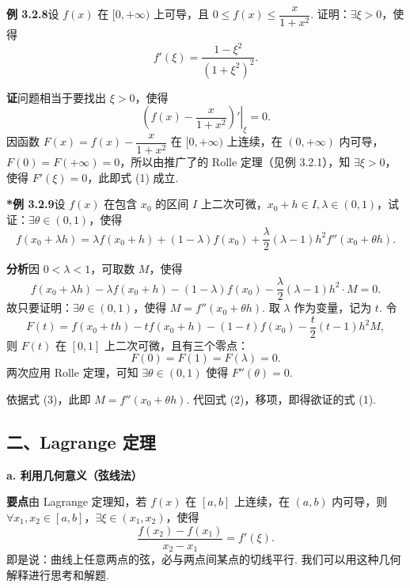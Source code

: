 \documentclass[UTF8,12pt,a4paper,fontset=fandol]{ctexart}
\begin{document}
\noindent\textbf{例 3.2.8}\quad 设 $f(x)$ 在 $[0,+\infty)$ 上可导，且 $0\le f(x)\le\dfrac{x}{1+x^2}$. 证明：$\exists\xi>0$，使得
\[
  f'(\xi)=\frac{1-\xi^2}{(1+\xi^2)^2}.
\]

\noindent\textbf{证}\quad 问题相当于要找出 $\xi>0$，使得
\begin{equation}
  \left.\left(f(x)-\frac{x}{1+x^2}\right)'\right|_{\xi}=0.
\tag{1}
\end{equation}
因函数 $F(x)=f(x)-\dfrac{x}{1+x^2}$ 在 $[0,+\infty)$ 上连续，在 $(0,+\infty)$ 内可导，$F(0)=F(+\infty)=0$，所以由推广了的 Rolle 定理（见例 3.2.1），知 $\exists\xi>0$，使得 $F'(\xi)=0$，此即式 (1) 成立.

\noindent\textbf{*例 3.2.9}\quad 设 $f(x)$ 在包含 $x_0$ 的区间 $I$ 上二次可微，$x_0+h\in I,\lambda\in(0,1)$，试证：$\exists\theta\in(0,1)$，使得
\begin{equation}
  f(x_0+\lambda h)=\lambda f(x_0+h)+(1-\lambda)f(x_0)+\frac{\lambda}{2}(\lambda-1)h^2f''(x_0+\theta h).
\tag{1}
\end{equation}

\noindent\textbf{分析}\quad 因 $0<\lambda<1$，可取数 $M$，使得
\begin{equation}
  f(x_0+\lambda h)-\lambda f(x_0+h)-(1-\lambda)f(x_0)-\frac{\lambda}{2}(\lambda-1)h^2\cdot M=0.
\tag{2}
\end{equation}
故只要证明：$\exists\theta\in(0,1)$，使得 $M=f''(x_0+\theta h)$. 取 $\lambda$ 作为变量，记为 $t$. 令
\begin{equation}
  F(t)=f(x_0+th)-tf(x_0+h)-(1-t)f(x_0)-\frac{t}{2}(t-1)h^2M,
\tag{3}
\end{equation}
则 $F(t)$ 在 $[0,1]$ 上二次可微，且有三个零点：
\[
  F(0)=F(1)=F(\lambda)=0.
\]
两次应用 Rolle 定理，可知 $\exists\theta\in(0,1)$ 使得 $F''(\theta)=0$.

依据式 (3)，此即 $M=f''(x_0+\theta h)$. 代回式 (2)，移项，即得欲证的式 (1).

\subsection*{二、Lagrange 定理}

\noindent\textbf{a. 利用几何意义（弦线法）}

\noindent\textbf{要点}\quad 由 Lagrange 定理知，若 $f(x)$ 在 $[a,b]$ 上连续，在 $(a,b)$ 内可导，则 $\forall x_1,x_2\in[a,b]$，$\exists\xi\in(x_1,x_2)$，使得
\[
  \frac{f(x_2)-f(x_1)}{x_2-x_1}=f'(\xi).
\]
即是说：曲线上任意两点的弦，必与两点间某点的切线平行. 我们可以用这种几何解释进行思考和解题.
\end{document}
